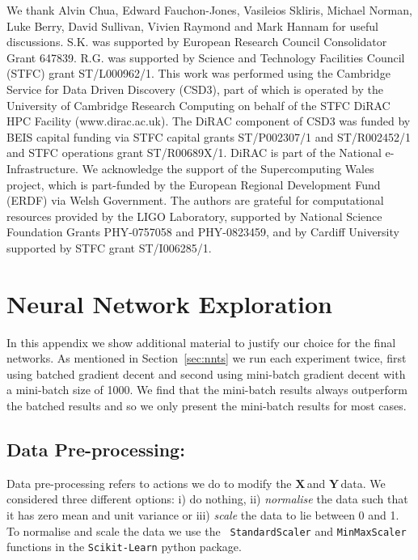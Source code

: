 \documentclass[aps,prd,reprint,superscriptaddress,preprintnumbers,showpacs,nofootinbib]{revtex4-1}
\newcommand{\X}{$\mathbf{X}\,$}
\newcommand{\Y}{$\mathbf{Y}\,$}
\begin{document}
\begin{acknowledgments}

We thank Alvin Chua, Edward Fauchon-Jones, Vasileios Skliris, Michael Norman,
Luke Berry, David Sullivan, Vivien Raymond and Mark Hannam for useful
discussions.
S.K. was supported by European Research Council Consolidator Grant 647839.
R.G. was supported by Science and Technology Facilities Council (STFC) grant
ST/L000962/1.
This work was performed using the Cambridge Service for Data Driven Discovery
(CSD3), part of which is operated by the University of Cambridge Research
Computing on behalf of the STFC DiRAC HPC Facility (www.dirac.ac.uk). The DiRAC
component of CSD3 was funded by BEIS capital funding via STFC capital grants
ST/P002307/1 and ST/R002452/1 and STFC operations grant ST/R00689X/1. DiRAC is
part of the National e-Infrastructure.
We acknowledge the support of the Supercomputing Wales project, which is
part-funded by the European Regional Development Fund (ERDF) via Welsh
Government.
The authors are grateful for computational resources provided by the LIGO
Laboratory, supported by National Science Foundation Grants PHY-0757058 and
PHY-0823459, and by Cardiff University supported by STFC grant ST/I006285/1.


\end{acknowledgments}




\appendix

\section{Neural Network Exploration}
\label{app:nn-explore}

In this appendix we show additional material to justify our choice for the final
networks. As mentioned in Section~\ref{sec:nnts} we run each experiment twice,
first using batched gradient decent and second using mini-batch gradient decent
with a mini-batch size of 1000. We find that the mini-batch results always
outperform the batched results and so we only present the mini-batch results for
most cases.

\subsection{Data Pre-processing:}
\label{app:nn-explore-preproc}

Data pre-processing refers to actions we do to modify the \X and \Y data. We
considered three different options: i) do nothing, ii) \emph{normalise} the data
such that it has zero mean and unit variance or iii) \emph{scale} the data to
lie between 0 and 1. To normalise and scale the data we use the {\tt
StandardScaler} and {\tt MinMaxScaler} functions in the {\tt Scikit-Learn}
python package.
\end{document}

